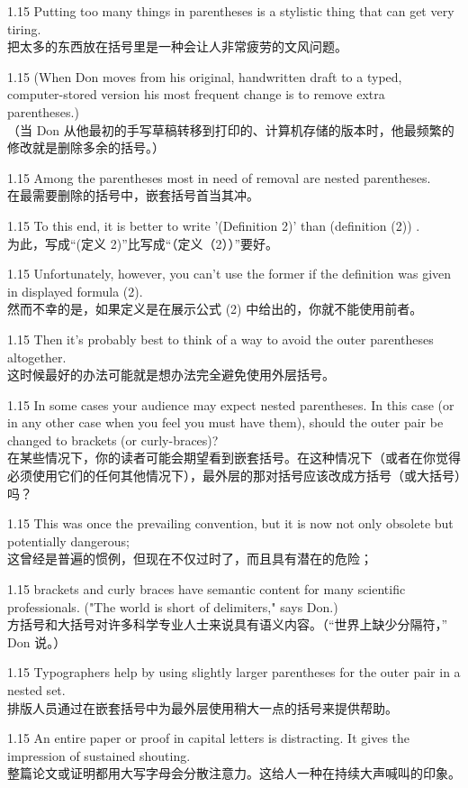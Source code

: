 \documentclass[12pt,a4paper]{article}
\newcommand{\bilingual}[2]{
    \begin{spacing}{1.15} %
        \noindent \normalsize #1 \\[-0.5ex] %
        \small \textcolor{blue!70!black}{#2} %
    \end{spacing}
    \vspace{0.8em} %
}
\begin{document}
\bilingual{Putting too many things in parentheses is a stylistic thing that can get very tiring.}
{把太多的东西放在括号里是一种会让人非常疲劳的文风问题。} %

\bilingual{(When Don moves from his original, handwritten draft to a typed, computer-stored version his most frequent change is to remove extra parentheses.)}
{（当 Don 从他最初的手写草稿转移到打印的、计算机存储的版本时，他最频繁的修改就是删除多余的括号。）} %

\bilingual{Among the parentheses most in need of removal are nested parentheses.}
{在最需要删除的括号中，嵌套括号首当其冲。} %

\bilingual{To this end, it is better to write '(Definition 2)' than (definition (2)) .}
{为此，写成“(定义 2)”比写成“（定义（2））”要好。} %

\bilingual{Unfortunately, however, you can't use the former if the definition was given in displayed formula (2).}
{然而不幸的是，如果定义是在展示公式 (2) 中给出的，你就不能使用前者。} %

\bilingual{Then it's probably best to think of a way to avoid the outer parentheses altogether.}
{这时候最好的办法可能就是想办法完全避免使用外层括号。} %

\bilingual{In some cases your audience may expect nested parentheses. In this case (or in any other case when you feel you must have them), should the outer pair be changed to brackets (or curly-braces)?}
{在某些情况下，你的读者可能会期望看到嵌套括号。在这种情况下（或者在你觉得必须使用它们的任何其他情况下），最外层的那对括号应该改成方括号（或大括号）吗？} %

\bilingual{This was once the prevailing convention, but it is now not only obsolete but potentially dangerous;}
{这曾经是普遍的惯例，但现在不仅过时了，而且具有潜在的危险；} %

\bilingual{brackets and curly braces have semantic content for many scientific professionals. ("The world is short of delimiters," says Don.)}
{方括号和大括号对许多科学专业人士来说具有语义内容。（“世界上缺少分隔符，” Don 说。）} %

\bilingual{Typographers help by using slightly larger parentheses for the outer pair in a nested set.}
{排版人员通过在嵌套括号中为最外层使用稍大一点的括号来提供帮助。} %

\bilingual{An entire paper or proof in capital letters is distracting. It gives the impression of sustained shouting.}
{整篇论文或证明都用大写字母会分散注意力。这给人一种在持续大声喊叫的印象。} %
\end{document}
